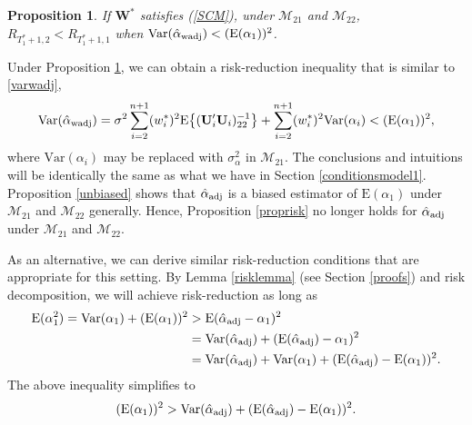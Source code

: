 \documentclass[11pt]{article}
\def\mbf#1{\mathbf{#1}} %
\def\mrm#1{\mathrm{#1}} %
\def\mc#1{\mathcal{#1}} %
\def\E#1{\mathrm{E}(#1)} %
\def\var#1{\mathrm{Var}(#1)} %
\newtheorem{prop}{Proposition}
\theoremstyle{definition}
\begin{document}
\begin{prop}
\label{propriskwadj2} If $\mbf{W}^*$ satisfies (\ref{SCM}), under $\mc{M}_{21}$ and $\mc{M}_{22}$, $R_{T_1^*+1,2}<R_{T_1^*+1,1}$ when $\var{\hat{\alpha}_{\rm wadj}}<(\E{\alpha_1})^2$. 
\end{prop}
Under Proposition \ref{propriskwadj2}, we can obtain a risk-reduction inequality that is similar to \eqref{varwadj},
\begin{align*}
\var{\hat{\alpha}_{\rm wadj}}
 = \sigma^2\sum_{i=2}^{n+1}(w_i^*)^2\mrm{E}\big\{(\mbf{U}'_i\mbf{U}_i)^{-1}_{22}\big\} + \sum_{i=2}^{n+1} (w_i^*)^2 \var{\alpha_i} < (\E{\alpha_1})^2,
\end{align*}
where $\var{\alpha_i}$ may be replaced with $\sigma^2_{\alpha}$ in $\mc{M}_{21}$. The conclusions and intuitions will be identically the same as what we have in Section \ref{conditionsmodel1}. Proposition \ref{unbiased} shows that $\hat{\alpha}_{\rm adj}$ is a biased estimator of $\E{\alpha_1}$ under $\mc{M}_{21}$ and $\mc{M}_{22}$ generally. Hence, Proposition \ref{proprisk} no longer holds for $\hat{\alpha}_{\rm adj}$ under $\mc{M}_{21}$ and $\mc{M}_{22}$.

As an alternative, we can derive similar risk-reduction conditions that are appropriate for this setting. By Lemma \ref{risklemma} (see Section \ref{proofs}) and risk decomposition, we will achieve risk-reduction as long as
\begin{align*}
 \E{\alpha_1^2}= \var{\alpha_1}+(\E{\alpha_1})^2
 &>\E{\hat{\alpha}_{\rm adj}-\alpha_1}^2\\
  &=\var{\hat{\alpha}_{\rm adj}} +  (\E{\hat{\alpha}_{\rm adj}}-\alpha_1)^2 \\
  &=\var{\hat{\alpha}_{\rm adj}} +  \var{\alpha_1} + (\E{\hat{\alpha}_{\rm adj}}-\E{\alpha_1})^2.
\end{align*}
The above inequality simplifies to 
\begin{equation} \label{ineq}
 (\E{\alpha_1})^2 >\var{\hat{\alpha}_{\rm adj}}+ (\E{\hat{\alpha}_{\rm adj}}-\E{\alpha_1})^2.
\end{equation}

\end{document}
